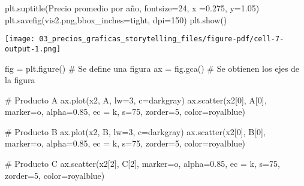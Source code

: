 \documentclass[
  letterpaper,
  DIV=11,
  numbers=noendperiod]{scrreprt}
\newenvironment{Shaded}{\begin{snugshade}}{\end{snugshade}}
\newcommand{\CommentTok}[1]{\textcolor[rgb]{0.37,0.37,0.37}{#1}}
\newcommand{\DecValTok}[1]{\textcolor[rgb]{0.68,0.00,0.00}{#1}}
\newcommand{\FloatTok}[1]{\textcolor[rgb]{0.68,0.00,0.00}{#1}}
\newcommand{\NormalTok}[1]{\textcolor[rgb]{0.00,0.23,0.31}{#1}}
\newcommand{\OperatorTok}[1]{\textcolor[rgb]{0.37,0.37,0.37}{#1}}
\newcommand{\StringTok}[1]{\textcolor[rgb]{0.13,0.47,0.30}{#1}}
\begin{document}
\begin{Shaded}
\begin{Highlighting}[]
\NormalTok{plt.suptitle(}\StringTok{\textquotesingle{}Precio promedio por año\textquotesingle{}}\NormalTok{, fontsize}\OperatorTok{=}\DecValTok{24}\NormalTok{, x }\OperatorTok{=}\FloatTok{0.275}\NormalTok{, y}\OperatorTok{=}\FloatTok{1.05}\NormalTok{)}
\NormalTok{plt.savefig(}\StringTok{\textquotesingle{}vis2.png\textquotesingle{}}\NormalTok{,bbox\_inches}\OperatorTok{=}\StringTok{\textquotesingle{}tight\textquotesingle{}}\NormalTok{, dpi}\OperatorTok{=}\DecValTok{150}\NormalTok{)}
\NormalTok{plt.show()}
\end{Highlighting}
\end{Shaded}

\texttt{[image: 03\_precios\_graficas\_storytelling\_files/figure-pdf/cell-7-output-1.png]}

\begin{Shaded}
\begin{Highlighting}[]
\NormalTok{fig }\OperatorTok{=}\NormalTok{ plt.figure() }\CommentTok{\# Se define una figura}
\NormalTok{ax }\OperatorTok{=}\NormalTok{ fig.gca()     }\CommentTok{\# Se obtienen los ejes de la figura}

\CommentTok{\# Producto A}
\NormalTok{ax.plot(x2, A, lw}\OperatorTok{=}\DecValTok{3}\NormalTok{, c}\OperatorTok{=}\StringTok{\textquotesingle{}darkgray\textquotesingle{}}\NormalTok{)}
\NormalTok{ax.scatter(x2[}\DecValTok{0}\NormalTok{], A[}\DecValTok{0}\NormalTok{], marker}\OperatorTok{=}\StringTok{\textquotesingle{}o\textquotesingle{}}\NormalTok{, alpha}\OperatorTok{=}\FloatTok{0.85}\NormalTok{, ec }\OperatorTok{=} \StringTok{\textquotesingle{}k\textquotesingle{}}\NormalTok{, s}\OperatorTok{=}\DecValTok{75}\NormalTok{, zorder}\OperatorTok{=}\DecValTok{5}\NormalTok{, color}\OperatorTok{=}\StringTok{\textquotesingle{}royalblue\textquotesingle{}}\NormalTok{)}

\CommentTok{\# Producto B}
\NormalTok{ax.plot(x2, B, lw}\OperatorTok{=}\DecValTok{3}\NormalTok{, c}\OperatorTok{=}\StringTok{\textquotesingle{}darkgray\textquotesingle{}}\NormalTok{)}
\NormalTok{ax.scatter(x2[}\DecValTok{0}\NormalTok{], B[}\DecValTok{0}\NormalTok{], marker}\OperatorTok{=}\StringTok{\textquotesingle{}o\textquotesingle{}}\NormalTok{, alpha}\OperatorTok{=}\FloatTok{0.85}\NormalTok{, ec }\OperatorTok{=} \StringTok{\textquotesingle{}k\textquotesingle{}}\NormalTok{, s}\OperatorTok{=}\DecValTok{75}\NormalTok{, zorder}\OperatorTok{=}\DecValTok{5}\NormalTok{, color}\OperatorTok{=}\StringTok{\textquotesingle{}royalblue\textquotesingle{}}\NormalTok{)}

\CommentTok{\# Producto C}
\NormalTok{ax.scatter(x2[}\DecValTok{2}\NormalTok{], C[}\DecValTok{2}\NormalTok{], marker}\OperatorTok{=}\StringTok{\textquotesingle{}o\textquotesingle{}}\NormalTok{, alpha}\OperatorTok{=}\FloatTok{0.85}\NormalTok{, ec }\OperatorTok{=} \StringTok{\textquotesingle{}k\textquotesingle{}}\NormalTok{, s}\OperatorTok{=}\DecValTok{75}\NormalTok{, zorder}\OperatorTok{=}\DecValTok{5}\NormalTok{, color}\OperatorTok{=}\StringTok{\textquotesingle{}royalblue\textquotesingle{}}\NormalTok{)}


\end{Highlighting}
\end{Shaded}
\end{document}
